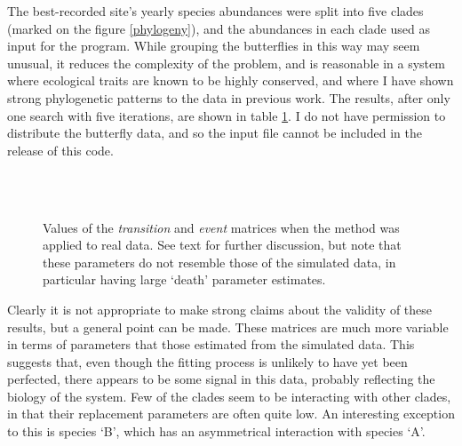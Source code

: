 \documentclass[12pt]{amsart}
\begin{document}
The best-recorded site's yearly species abundances were split into five clades (marked on the figure \ref{phylogeny}), and the abundances in each clade used as input for the program. While grouping the butterflies in this way may seem unusual, it reduces the complexity of the problem, and is reasonable in a system where ecological traits are known to be highly conserved, and where I have shown strong phylogenetic patterns to the data in previous work. The results, after only one search with five iterations, are shown in table \ref{ecolResults}. I do not have permission to distribute the butterfly data, and so the input file cannot be included in the release of this code.
\begin{figure}
\centering
{}\\
\\
\caption{Values of the \emph{transition} and \emph{event} matrices when the method was applied to real data. See text for further discussion, but note that these parameters do not resemble those of the simulated data, in particular having large `death' parameter estimates.}\label{ecolResults}
\end{figure}

Clearly it is not appropriate to make strong claims about the validity of these results, but a general point can be made. These matrices are much more variable in terms of parameters that those estimated from the simulated data. This suggests that, even though the fitting process is unlikely to have yet been perfected, there appears to be some signal in this data, probably reflecting the biology of the system. Few of the clades seem to be interacting with other clades, in that their replacement parameters are often quite low. An interesting exception to this is species `B', which has an asymmetrical interaction with species `A'.
\end{document}
